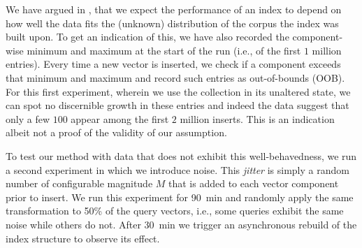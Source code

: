 We have argued in , that we expect the performance of an index to depend on how well the data fits the (unknown) distribution of the corpus the index was built upon. To get an indication of this, we have also recorded the component-wise minimum and maximum at the start of the run (i.e., of the first $1$ million entries). Every time a new vector is inserted, we check if a component exceeds that minimum and maximum and record such entries as out-of-bounds (OOB). For this first experiment, wherein we use the collection in its unaltered state, we can spot no discernible growth in these entries and indeed the data suggest that only a few $100$ appear among the first $2$ million inserts. This is an indication albeit not a proof of the validity of our assumption.

To test our method with data that does not exhibit this well-behavedness, we run a second experiment in which we introduce noise. This \emph{jitter} is simply a random number of configurable magnitude $M$ that is added to each vector component prior to insert. We run this experiment for \SI{90}{\minute} and randomly apply the same transformation to 50\% of the query vectors, i.e., some queries exhibit the same noise while others do not. After \SI{30}{\minute} we trigger an asynchronous rebuild of the index structure to observe its effect.

